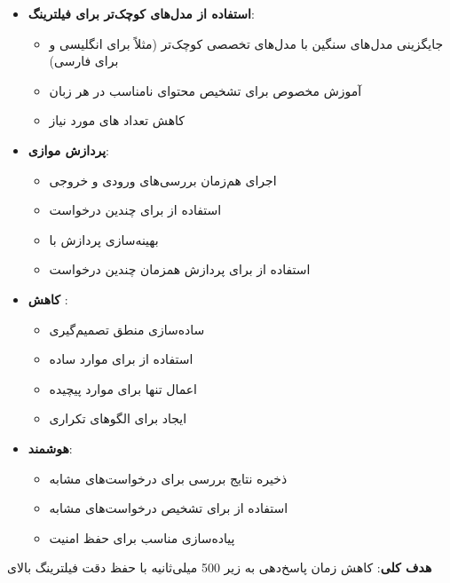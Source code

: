 \documentclass[11pt, a4paper, oneside]{book}
\begin{document}
	\begin{itemize}
		\item \textbf{استفاده از مدل‌های کوچک‌تر برای فیلترینگ}:
		\begin{itemize}
			\item جایگزینی مدل‌های سنگین با مدل‌های تخصصی کوچک‌تر (مثلاً  برای انگلیسی و  برای فارسی)
			\item آموزش  مخصوص برای تشخیص محتوای نامناسب در هر زبان
			\item کاهش تعداد  های مورد نیاز
		\end{itemize}
		
		\item \textbf{پردازش موازی}:
		\begin{itemize}
			\item اجرای هم‌زمان بررسی‌های ورودی و خروجی
			\item استفاده از  برای چندین درخواست
			\item بهینه‌سازی  پردازش با 
			\item استفاده از  برای پردازش همزمان چندین درخواست
		\end{itemize}
		
		\item \textbf{کاهش }:
		\begin{itemize}
			\item ساده‌سازی منطق تصمیم‌گیری 
			\item استفاده از  برای موارد ساده
			\item اعمال  تنها برای موارد پیچیده
			\item ایجاد  برای الگوهای تکراری
		\end{itemize}
		
		\item \textbf{ هوشمند}:
		\begin{itemize}
			\item ذخیره نتایج بررسی برای درخواست‌های مشابه
			\item استفاده از  برای تشخیص درخواست‌های مشابه
			\item پیاده‌سازی  مناسب برای حفظ امنیت
		\end{itemize}
	\end{itemize}

	\textbf{هدف کلی}: کاهش زمان پاسخ‌دهی به زیر 500 میلی‌ثانیه با حفظ دقت فیلترینگ بالای 
\end{document}
